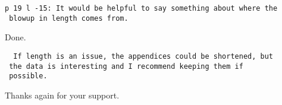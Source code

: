 \documentclass[runningheads]{llncs}
\begin{document}
\begin{verbatim}
p 19 l -15: It would be helpful to say something about where the
 blowup in length comes from.
\end{verbatim}

Done.

\begin{verbatim}
  If length is an issue, the appendices could be shortened, but
 the data is interesting and I recommend keeping them if
 possible.
\end{verbatim}

Thanks again for your support.
\end{document}
